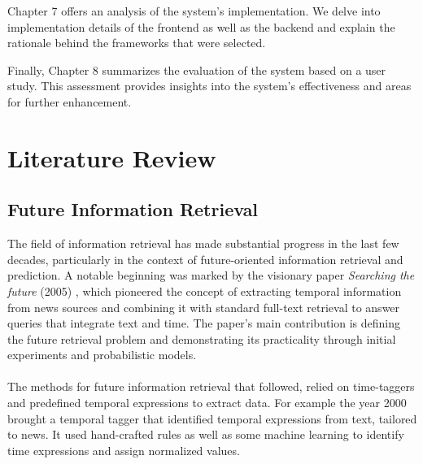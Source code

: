 \documentclass[12pt,oneside,bibtotoc,liststotoc]{scrbook}
\begin{document}
Chapter 7 offers an analysis of the system's implementation. We delve into implementation details of the frontend as well as the backend and explain the rationale behind the frameworks that were selected.

Finally, Chapter 8 summarizes the evaluation of the system based on a user study. This assessment provides insights into the system's effectiveness and areas for further enhancement.



\chapter{Literature Review}

\section{Future Information Retrieval}
The field of information retrieval has made substantial progress in the last few decades, particularly in the context of future-oriented information retrieval and prediction. A notable beginning was marked by the visionary paper \textit{Searching the future} (2005) \cite{BaezaYatesSearchingTF}, which pioneered the concept of extracting temporal information from news sources and combining it with standard full-text retrieval to answer queries that integrate text and time. The paper's main contribution is defining the future retrieval problem and demonstrating its practicality through initial experiments and probabilistic models.
\\\\
The methods for future information retrieval that followed, relied on time-taggers and predefined temporal expressions to extract data.
For example the year 2000 brought a temporal tagger \cite{ManiRobustTP} that identified temporal expressions from text, tailored to news. It used hand-crafted rules as well as some machine learning to identify time expressions and assign normalized values.
\end{document}
